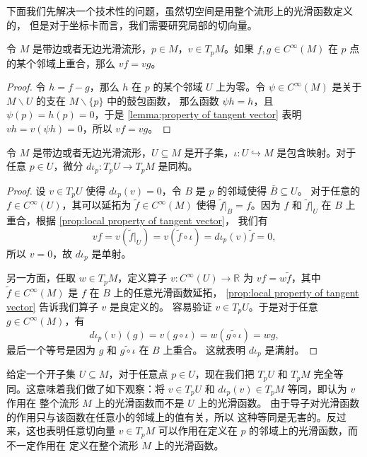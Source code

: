 \documentclass[fontset=none]{Notes}
\begin{document}
下面我们先解决一个技术性的问题，虽然切空间是用整个流形上的光滑函数定义的，
但是对于坐标卡而言，我们需要研究局部的切向量。

\begin{proposition}\label{prop:local property of tangent vector}
  令 $M$ 是带边或者无边光滑流形，$p\in M$，$v\in T_pM$。如果 $f,g\in C^\infty(M)$
  在 $p$ 点的某个邻域上重合，那么 $vf=vg$。
\end{proposition}
\begin{proof}
  令 $h=f-g$，那么 $h$ 在 $p$ 的某个邻域 $U$ 上为零。令 $\psi\in C^\infty(M)$
  是关于 $M\smallsetminus U$ 的支在 $M\smallsetminus \{p\}$ 中的鼓包函数，
  那么函数 $\psi h=h$，且 $\psi(p)=h(p)=0$，于是 \autoref{lemma:property of tangent vector}
  表明 $v h=v(\psi h)=0$，所以 $vf=vg$。
\end{proof}

\begin{proposition}[开子流形的切空间]\label{prop:tangent space of open submanifold}
  令 $M$ 是带边或者无边光滑流形，$U\subseteq M$ 是开子集，$\iota:U\hookrightarrow M$
  是包含映射。对于任意 $p\in U$，微分 $d\iota_p:T_pU\to T_pM$ 是同构。
\end{proposition}
\begin{proof}
  设 $v\in T_pU$ 使得 $d\iota_p(v)=0$，令 $B$ 是 $p$ 的邻域使得 $\bar B\subseteq U$。
  对于任意的 $f\in C^\infty(U)$，其可以延拓为 $\tilde{f}\in C^\infty(M)$ 使得
  $\tilde{f}\big|_B=f$。因为 $f$ 和 $\tilde{f}\big|_U$ 在 $B$ 上重合，根据 \autoref{prop:local property of tangent vector}，
  我们有
  \[
    vf=v\left(\tilde{f}\big|_U\right)=v\left(\tilde{f}\circ\iota\right)=
    d\iota_p(v)\tilde{f}=0,
  \]
  所以 $v=0$，故 $d\iota_p$ 是单射。

  另一方面，任取 $w\in T_pM$，定义算子 $v:C^\infty(U)\to\mathbb{R}$ 为
  $vf=w\tilde{f}$，其中 $\tilde{f}\in C^\infty(M)$ 是 $f$ 在 $B$ 上的任意光滑函数延拓，
  \autoref{prop:local property of tangent vector} 告诉我们算子 $v$ 是良定义的。
  容易验证 $v\in T_pU$。于是对于任意 $g\in C^\infty(M)$，有
  \[
    d\iota_p(v)(g)=v(g\circ\iota)=w\left(\widetilde{g\circ\iota}\right) 
    =wg,
  \]
  最后一个等号是因为 $g$ 和 $\widetilde{g\circ\iota}$ 在 $B$ 上重合。
  这就表明 $d\iota_p$ 是满射。
\end{proof}

给定一个开子集 $U\subseteq M$，对于任意点 $p\in U$，现在我们把
$T_pU$ 和 $T_pM$ 完全等同。这意味着我们做了如下观察：将 
$v\in T_pU$ 和 $d\iota_p(v)\in T_pM$ 等同，即认为 $v$ 作用在
整个流形 $M$ 上的光滑函数而不是 $U$ 上的光滑函数。
由于导子对光滑函数的作用只与该函数在任意小的邻域上的值有关，所以
这种等同是无害的。反过来，这也表明任意切向量 $v\in T_pM$
可以作用在定义在 $p$ 的邻域上的光滑函数，而不一定作用在
定义在整个流形 $M$ 上的光滑函数。
\end{document}
